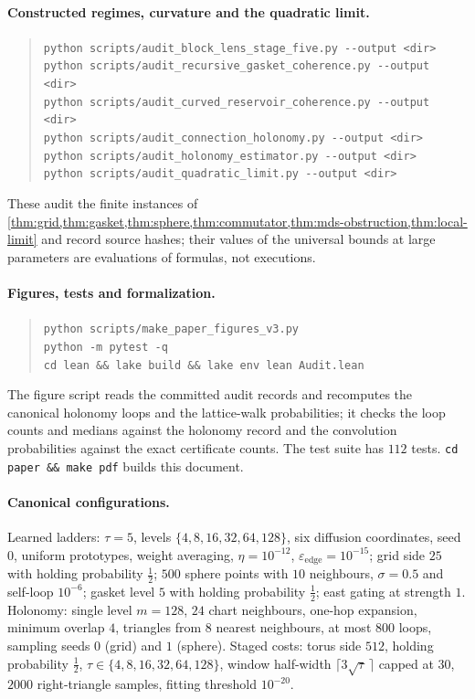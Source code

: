 \paragraph{Constructed regimes, curvature and the quadratic limit.}
\begin{quote}\small
\texttt{python scripts/audit\_block\_lens\_stage\_five.py -{}-output <dir>}\\
\texttt{python scripts/audit\_recursive\_gasket\_coherence.py -{}-output <dir>}\\
\texttt{python scripts/audit\_curved\_reservoir\_coherence.py -{}-output <dir>}\\
\texttt{python scripts/audit\_connection\_holonomy.py -{}-output <dir>}\\
\texttt{python scripts/audit\_holonomy\_estimator.py -{}-output <dir>}\\
\texttt{python scripts/audit\_quadratic\_limit.py -{}-output <dir>}
\end{quote}
These audit the finite instances of \cref{thm:grid,thm:gasket,thm:sphere,thm:commutator,thm:mds-obstruction,thm:local-limit} and record source hashes; their values of the universal bounds at large parameters are evaluations of formulas, not executions.

\paragraph{Figures, tests and formalization.}
\begin{quote}\small
\texttt{python scripts/make\_paper\_figures\_v3.py}\\
\texttt{python -m pytest -q}\\
\texttt{cd lean \&\& lake build \&\& lake env lean Audit.lean}
\end{quote}
The figure script reads the committed audit records and recomputes the canonical holonomy loops and the lattice-walk probabilities; it checks the loop counts and medians against the holonomy record and the convolution probabilities against the exact certificate counts.
The test suite has $112$ tests.
\texttt{cd paper \&\& make pdf} builds this document.

\paragraph{Canonical configurations.}
Learned ladders: $\tau=5$, levels $\{4,8,16,32,64,128\}$, six diffusion coordinates, seed $0$, uniform prototypes, weight averaging, $\eta=10^{-12}$, $\varepsilon_{\mathrm{edge}}=10^{-15}$; grid side $25$ with holding probability $\tfrac12$; $500$ sphere points with $10$ neighbours, $\sigma=0.5$ and self-loop $10^{-6}$; gasket level $5$ with holding probability $\tfrac12$; east gating at strength $1$.
Holonomy: single level $m=128$, $24$ chart neighbours, one-hop expansion, minimum overlap $4$, triangles from $8$ nearest neighbours, at most $800$ loops, sampling seeds $0$ (grid) and $1$ (sphere).
Staged costs: torus side $512$, holding probability $\tfrac12$, $\tau\in\{4,8,16,32,64,128\}$, window half-width $\lceil3\sqrt\tau\,\rceil$ capped at $30$, $2000$ right-triangle samples, fitting threshold $10^{-20}$.

